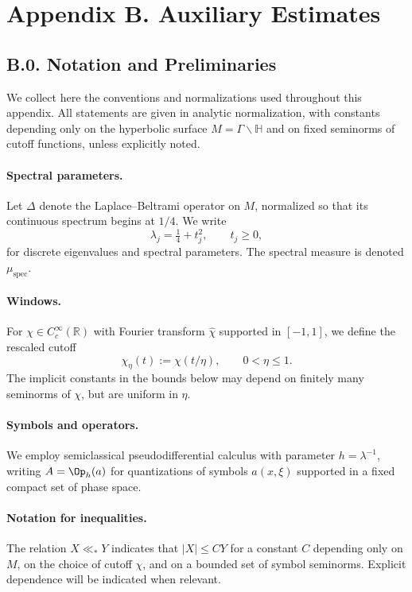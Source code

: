 \section*{Appendix B. Auxiliary Estimates}

\subsection*{B.0. Notation and Preliminaries}

We collect here the conventions and normalizations used throughout this appendix.  
All statements are given in analytic normalization, with constants depending only 
on the hyperbolic surface $M = \Gamma \backslash \mathbb H$ and on fixed seminorms 
of cutoff functions, unless explicitly noted.

\paragraph{Spectral parameters.}
Let $\Delta$ denote the Laplace--Beltrami operator on $M$, normalized so that 
its continuous spectrum begins at $1/4$.  We write
\[
  \lambda_j = \tfrac14 + t_j^2, \qquad t_j \ge 0,
\]
for discrete eigenvalues and spectral parameters.  The spectral measure is denoted 
$\mu_{\mathrm{spec}}$.

\paragraph{Windows.}
For $\chi \in C_c^\infty(\mathbb R)$ with Fourier transform $\widehat\chi$ supported 
in $[-1,1]$, we define the rescaled cutoff
\[
  \chi_\eta(t) := \chi(t/\eta), \qquad 0 < \eta \le 1.
\]
The implicit constants in the bounds below may depend on finitely many seminorms 
of $\chi$, but are uniform in $\eta$.

\paragraph{Symbols and operators.}
We employ semiclassical pseudodifferential calculus with parameter $h=\lambda^{-1}$, 
writing $A = \Op_h(a)$ for quantizations of symbols $a(x,\xi)$ supported in a fixed compact set of phase space.

\paragraph{Notation for inequalities.}
The relation $X \ll_* Y$ indicates that $|X| \le C Y$ for a constant $C$ depending 
only on $M$, on the choice of cutoff $\chi$, and on a bounded set of symbol seminorms.  
Explicit dependence will be indicated when relevant.

